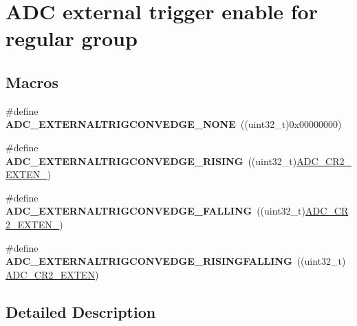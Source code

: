 \hypertarget{group___a_d_c___external__trigger__edge___regular}{\section{A\-D\-C external trigger enable for regular group}
\label{group___a_d_c___external__trigger__edge___regular}
}
\subsection*{Macros}
\begin{DoxyCompactItemize}
\item 
\hypertarget{group___a_d_c___external__trigger__edge___regular_gab2e3a19c05441925f9b9a482238994ac}{\#define {\bfseries A\-D\-C\-\_\-\-E\-X\-T\-E\-R\-N\-A\-L\-T\-R\-I\-G\-C\-O\-N\-V\-E\-D\-G\-E\-\_\-\-N\-O\-N\-E}~((uint32\-\_\-t)0x00000000)}\label{group___a_d_c___external__trigger__edge___regular_gab2e3a19c05441925f9b9a482238994ac}

\item 
\hypertarget{group___a_d_c___external__trigger__edge___regular_ga0aaa4e876de630733ca4ca4116b9608e}{\#define {\bfseries A\-D\-C\-\_\-\-E\-X\-T\-E\-R\-N\-A\-L\-T\-R\-I\-G\-C\-O\-N\-V\-E\-D\-G\-E\-\_\-\-R\-I\-S\-I\-N\-G}~((uint32\-\_\-t)\hyperlink{group___peripheral___registers___bits___definition_ga3519da0cc6fbd31444a16244c70232e6}{A\-D\-C\-\_\-\-C\-R2\-\_\-\-E\-X\-T\-E\-N\-\_})}\label{group___a_d_c___external__trigger__edge___regular_ga0aaa4e876de630733ca4ca4116b9608e}

\item 
\hypertarget{group___a_d_c___external__trigger__edge___regular_ga15975c01b6a514f346272a1373239c54}{\#define {\bfseries A\-D\-C\-\_\-\-E\-X\-T\-E\-R\-N\-A\-L\-T\-R\-I\-G\-C\-O\-N\-V\-E\-D\-G\-E\-\_\-\-F\-A\-L\-L\-I\-N\-G}~((uint32\-\_\-t)\hyperlink{group___peripheral___registers___bits___definition_ga17e37edddbb6ad791bffb350cca23d4d}{A\-D\-C\-\_\-\-C\-R2\-\_\-\-E\-X\-T\-E\-N\-\_})}\label{group___a_d_c___external__trigger__edge___regular_ga15975c01b6a514f346272a1373239c54}

\item 
\hypertarget{group___a_d_c___external__trigger__edge___regular_gab4221f5f52b5f75dc8cea701bb57be35}{\#define {\bfseries A\-D\-C\-\_\-\-E\-X\-T\-E\-R\-N\-A\-L\-T\-R\-I\-G\-C\-O\-N\-V\-E\-D\-G\-E\-\_\-\-R\-I\-S\-I\-N\-G\-F\-A\-L\-L\-I\-N\-G}~((uint32\-\_\-t)\hyperlink{group___peripheral___registers___bits___definition_ga574b4d8e90655d0432882d620e629234}{A\-D\-C\-\_\-\-C\-R2\-\_\-\-E\-X\-T\-E\-N})}\label{group___a_d_c___external__trigger__edge___regular_gab4221f5f52b5f75dc8cea701bb57be35}

\end{DoxyCompactItemize}


\subsection{Detailed Description}
